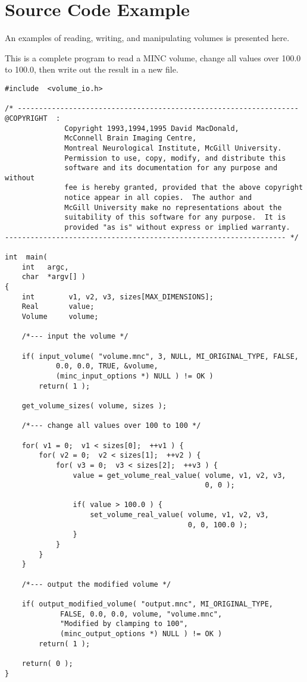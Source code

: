 \section{Source Code Example}

An examples of reading, writing, and manipulating volumes is
presented here.

This is a complete program to read a MINC volume, change all values
over 100.0 to 100.0, then write out the result in a new file.

{\small
\begin{verbatim}
#include  <volume_io.h>

/* ------------------------------------------------------------------
@COPYRIGHT  :
              Copyright 1993,1994,1995 David MacDonald,
              McConnell Brain Imaging Centre,
              Montreal Neurological Institute, McGill University.
              Permission to use, copy, modify, and distribute this
              software and its documentation for any purpose and without
              fee is hereby granted, provided that the above copyright
              notice appear in all copies.  The author and
              McGill University make no representations about the
              suitability of this software for any purpose.  It is
              provided "as is" without express or implied warranty.
------------------------------------------------------------------ */

int  main(
    int   argc,
    char  *argv[] )
{
    int        v1, v2, v3, sizes[MAX_DIMENSIONS];
    Real       value;
    Volume     volume;

    /*--- input the volume */

    if( input_volume( "volume.mnc", 3, NULL, MI_ORIGINAL_TYPE, FALSE,
            0.0, 0.0, TRUE, &volume,
            (minc_input_options *) NULL ) != OK )
        return( 1 );

    get_volume_sizes( volume, sizes );

    /*--- change all values over 100 to 100 */

    for( v1 = 0;  v1 < sizes[0];  ++v1 ) {
        for( v2 = 0;  v2 < sizes[1];  ++v2 ) {
            for( v3 = 0;  v3 < sizes[2];  ++v3 ) {
                value = get_volume_real_value( volume, v1, v2, v3,
                                               0, 0 );

                if( value > 100.0 ) {
                    set_volume_real_value( volume, v1, v2, v3,
                                           0, 0, 100.0 );
                }
            }
        }
    }

    /*--- output the modified volume */

    if( output_modified_volume( "output.mnc", MI_ORIGINAL_TYPE,
             FALSE, 0.0, 0.0, volume, "volume.mnc",
             "Modified by clamping to 100",
             (minc_output_options *) NULL ) != OK )
        return( 1 );

    return( 0 );
}
\end{verbatim}
}

